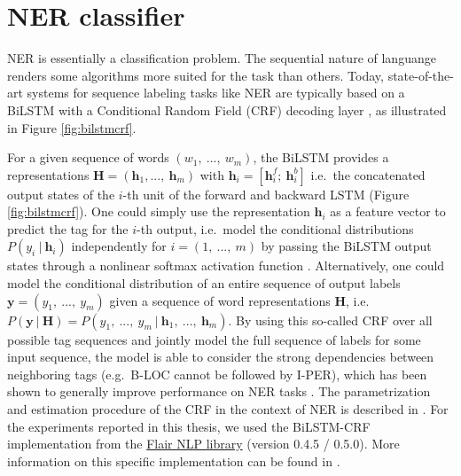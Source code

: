 \documentclass[12pt,a4paper,]{book}
\begin{document}
\newpage

\hypertarget{ner-classifier}{%
\section{NER classifier}\label{ner-classifier}}

NER is essentially a classification problem. The sequential nature of languange renders some algorithms more suited for the task than others. Today, state-of-the-art systems for sequence labeling tasks like NER are typically based on a BiLSTM with a Conditional Random Field (CRF) decoding layer \citep{lafferty2001}, as illustrated in Figure \ref{fig:bilstmcrf}.

For a given sequence of words \((w_1, \ ..., \ w_m)\), the BiLSTM provides a representations \(\mathbf{H} = (\mathbf{h}_1, ... , \ \mathbf{h}_m)\) with \(\mathbf{h}_i = [\mathbf{h}_i^f ; \ \mathbf{h}_i^b]\) i.e.~the concatenated output states of the \(i\)-th unit of the forward and backward LSTM (Figure \ref{fig:bilstmcrf}). One could simply use the representation \(\mathbf{h}_i\) as a feature vector to predict the tag for the \(i\)-th output, i.e.~model the conditional distributions \(P(y_i \ | \ \mathbf{h}_i)\) independently for \(i=(1, \ ..., \ m)\) by passing the BiLSTM output states through a nonlinear softmax activation function \citep{goodfellow2016}. Alternatively, one could model the conditional distribution of an entire sequence of output labels \(\mathbf{y} = (y_1, \ ..., \ y_m)\) given a sequence of word representations \(\mathbf{H}\), i.e. \(P(\mathbf{y} \ | \ \mathbf{H}) = P(y_1, \ ..., \ y_m \ | \ \mathbf{h}_1, \ ..., \ \mathbf{h}_m )\). By using this so-called CRF over all possible tag sequences and jointly model the full sequence of labels for some input sequence, the model is able to consider the strong dependencies between neighboring tags (e.g.~B-LOC cannot be followed by I-PER), which has been shown to generally improve performance on NER tasks \citep{huang2015, reimers2017}. The parametrization and estimation procedure of the CRF in the context of NER is described in \citep{ma2016}. For the experiments reported in this thesis, we used the BiLSTM-CRF implementation from the \href{https://github.com/flairNLP/flair}{Flair NLP library} (version 0.4.5 / 0.5.0). More information on this specific implementation can be found in \citep{akbik2018, huang2015}.
\end{document}
